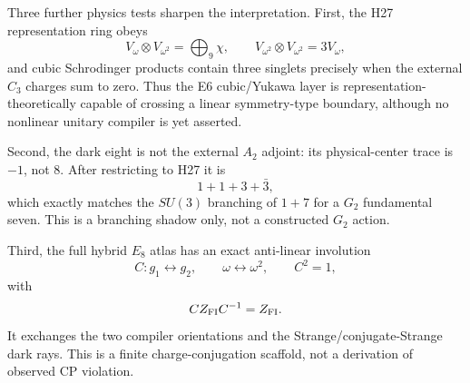 Three further physics tests sharpen the interpretation.  First, the H27
representation ring obeys
\[
V_\omega\otimes V_{\omega^2}=\bigoplus_{9}\chi,\qquad
V_{\omega^2}\otimes V_{\omega^2}=3V_\omega,
\]
and cubic Schrodinger products contain three singlets precisely when the
external \(C_3\) charges sum to zero.  Thus the E6 cubic/Yukawa layer is
representation-theoretically capable of crossing a linear symmetry-type
boundary, although no nonlinear unitary compiler is yet asserted.

Second, the dark eight is not the external \(A_2\) adjoint: its physical-center
trace is \(-1\), not \(8\).  After restricting to H27 it is
\[
1+1+3+\bar3,
\]
which exactly matches the \(SU(3)\) branching of \(1+7\) for a \(G_2\)
fundamental seven.  This is a branching shadow only, not a constructed
\(G_2\) action.

Third, the full hybrid \(E_8\) atlas has an exact anti-linear involution
\[
C:g_1\leftrightarrow g_2,\qquad \omega\leftrightarrow\omega^2,
\qquad C^2=1,
\]
with
\[
CZ_{\rm FI}C^{-1}=Z_{\rm FI}.
\]
It exchanges the two compiler orientations and the Strange/conjugate-Strange
dark rays.  This is a finite charge-conjugation scaffold, not a derivation of
observed CP violation.
